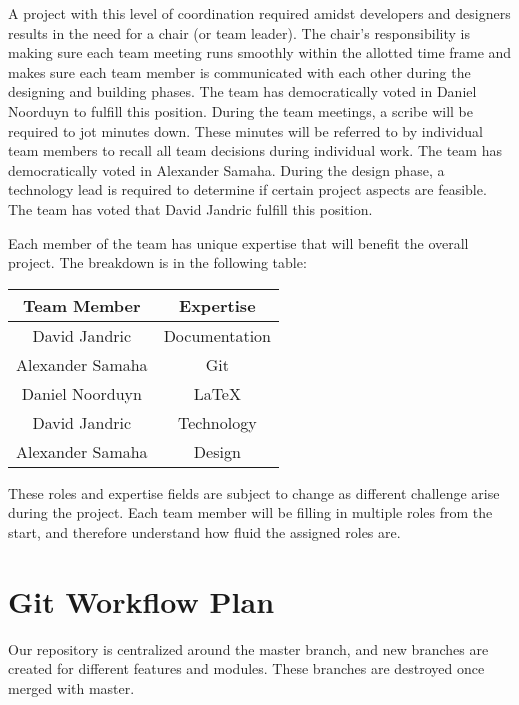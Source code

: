 \documentclass{article}
\begin{document}
A project with this level of coordination required amidst developers and
designers results in the need for a chair (or team leader). The chair's
responsibility is making sure each team meeting runs smoothly within the
allotted time frame and makes sure each team member is communicated with each
other during the designing and building phases. The team has democratically
voted in Daniel Noorduyn to fulfill this position.  During the team meetings, a
scribe will be required to jot minutes down. These minutes will be referred to
by individual team members to recall all team decisions during individual work.
The team has democratically voted in Alexander Samaha. During the design phase,
a technology lead is required to determine if certain project aspects are
feasible. The team has voted that David Jandric fulfill this position.

Each member of the team has unique expertise that will benefit the overall
project. The breakdown is in the following table:

\begin{center}
  \begin{tabular}{ |c|c| }
    \hline
    Team Member & Expertise\\
    \hline
     David Jandric & Documentation\\
     Alexander Samaha & Git\\
     Daniel Noorduyn & LaTeX\\
     David Jandric & Technology\\
     Alexander Samaha & Design\\
    \hline
  \end{tabular}
\end{center}

These roles and expertise fields are subject to change as different challenge
arise during the project. Each team member will be filling in multiple roles
from the start, and therefore understand how fluid the assigned roles are.

\section{Git Workflow Plan}

Our repository is centralized around the master branch, and new branches are
created for different features and modules. These branches are destroyed once merged with master.
\end{document}
